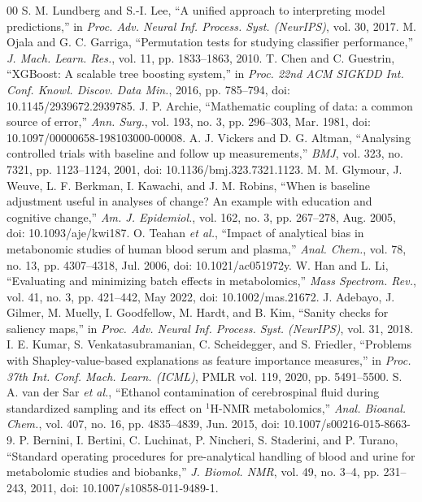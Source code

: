 \documentclass[conference]{IEEEtran}
\begin{document}
\begin{thebibliography}{00}
 S. M. Lundberg and S.-I. Lee, ``A unified approach to interpreting model predictions,'' in \textit{Proc. Adv. Neural Inf. Process. Syst. (NeurIPS)}, vol. 30, 2017.
 M. Ojala and G. C. Garriga, ``Permutation tests for studying classifier performance,'' \textit{J. Mach. Learn. Res.}, vol. 11, pp. 1833--1863, 2010.
 T. Chen and C. Guestrin, ``XGBoost: A scalable tree boosting system,'' in \textit{Proc. 22nd ACM SIGKDD Int. Conf. Knowl. Discov. Data Min.}, 2016, pp. 785--794, doi: 10.1145/2939672.2939785.
 J. P. Archie, ``Mathematic coupling of data: a common source of error,'' \textit{Ann. Surg.}, vol. 193, no. 3, pp. 296--303, Mar. 1981, doi: 10.1097/00000658-198103000-00008.
 A. J. Vickers and D. G. Altman, ``Analysing controlled trials with baseline and follow up measurements,'' \textit{BMJ}, vol. 323, no. 7321, pp. 1123--1124, 2001, doi: 10.1136/bmj.323.7321.1123.
 M. M. Glymour, J. Weuve, L. F. Berkman, I. Kawachi, and J. M. Robins, ``When is baseline adjustment useful in analyses of change? An example with education and cognitive change,'' \textit{Am. J. Epidemiol.}, vol. 162, no. 3, pp. 267--278, Aug. 2005, doi: 10.1093/aje/kwi187.
 O. Teahan \textit{et al.}, ``Impact of analytical bias in metabonomic studies of human blood serum and plasma,'' \textit{Anal. Chem.}, vol. 78, no. 13, pp. 4307--4318, Jul. 2006, doi: 10.1021/ac051972y.
 W. Han and L. Li, ``Evaluating and minimizing batch effects in metabolomics,'' \textit{Mass Spectrom. Rev.}, vol. 41, no. 3, pp. 421--442, May 2022, doi: 10.1002/mas.21672.
 J. Adebayo, J. Gilmer, M. Muelly, I. Goodfellow, M. Hardt, and B. Kim, ``Sanity checks for saliency maps,'' in \textit{Proc. Adv. Neural Inf. Process. Syst. (NeurIPS)}, vol. 31, 2018.
 I. E. Kumar, S. Venkatasubramanian, C. Scheidegger, and S. Friedler, ``Problems with Shapley-value-based explanations as feature importance measures,'' in \textit{Proc. 37th Int. Conf. Mach. Learn. (ICML)}, PMLR vol. 119, 2020, pp. 5491--5500.
 S. A. van der Sar \textit{et al.}, ``Ethanol contamination of cerebrospinal fluid during standardized sampling and its effect on $^1$H-NMR metabolomics,'' \textit{Anal. Bioanal. Chem.}, vol. 407, no. 16, pp. 4835--4839, Jun. 2015, doi: 10.1007/s00216-015-8663-9.
 P. Bernini, I. Bertini, C. Luchinat, P. Nincheri, S. Staderini, and P. Turano, ``Standard operating procedures for pre-analytical handling of blood and urine for metabolomic studies and biobanks,'' \textit{J. Biomol. NMR}, vol. 49, no. 3--4, pp. 231--243, 2011, doi: 10.1007/s10858-011-9489-1.

\end{thebibliography}
\end{document}
